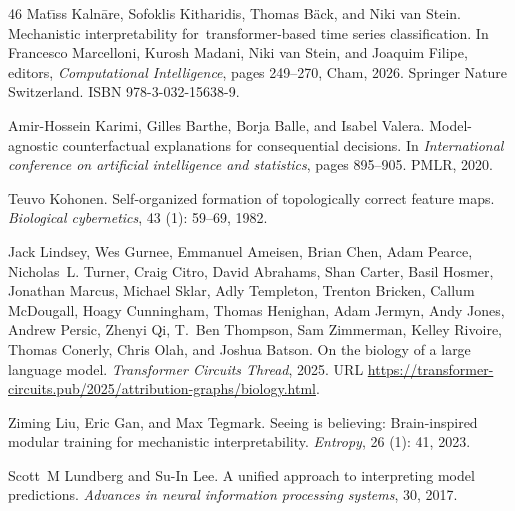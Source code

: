 \begin{thebibliography}{46}
Mat{\={\i}}ss Kaln{\={a}}re, Sofoklis Kitharidis, Thomas B{\"a}ck, and Niki van Stein.
\newblock Mechanistic interpretability for transformer-based time series classification.
\newblock In Francesco Marcelloni, Kurosh Madani, Niki van Stein, and Joaquim Filipe, editors, \emph{Computational Intelligence}, pages 249--270, Cham, 2026. Springer Nature Switzerland.
\newblock ISBN 978-3-032-15638-9.

Amir-Hossein Karimi, Gilles Barthe, Borja Balle, and Isabel Valera.
\newblock Model-agnostic counterfactual explanations for consequential decisions.
\newblock In \emph{International conference on artificial intelligence and statistics}, pages 895--905. PMLR, 2020.

Teuvo Kohonen.
\newblock Self-organized formation of topologically correct feature maps.
\newblock \emph{Biological cybernetics}, 43 (1): 59--69, 1982.

Jack Lindsey, Wes Gurnee, Emmanuel Ameisen, Brian Chen, Adam Pearce, Nicholas~L. Turner, Craig Citro, David Abrahams, Shan Carter, Basil Hosmer, Jonathan Marcus, Michael Sklar, Adly Templeton, Trenton Bricken, Callum McDougall, Hoagy Cunningham, Thomas Henighan, Adam Jermyn, Andy Jones, Andrew Persic, Zhenyi Qi, T.~Ben Thompson, Sam Zimmerman, Kelley Rivoire, Thomas Conerly, Chris Olah, and Joshua Batson.
\newblock On the biology of a large language model.
\newblock \emph{Transformer Circuits Thread}, 2025.
\newblock URL \url{https://transformer-circuits.pub/2025/attribution-graphs/biology.html}.

Ziming Liu, Eric Gan, and Max Tegmark.
\newblock Seeing is believing: Brain-inspired modular training for mechanistic interpretability.
\newblock \emph{Entropy}, 26 (1): 41, 2023.

Scott~M Lundberg and Su-In Lee.
\newblock A unified approach to interpreting model predictions.
\newblock \emph{Advances in neural information processing systems}, 30, 2017.


\end{thebibliography}
